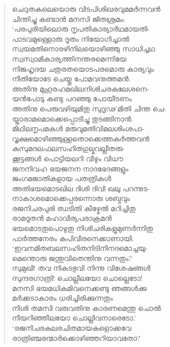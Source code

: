 \begin{verse}
ചെറുതകലെയൊരു വിടപിശിഖരവുമമര്‍ന്നവന്‍\\
ചിന്തിച്ചു കണ്ടാന്‍ മനസി ജിതശ്രമം:\\
‘പരപുരിയിലൊരു നൃപതികാര്യാര്‍ഥമായതി-\\
പാടവമുള്ളൊരു ദൂതം നിയോഗിച്ചാല്‍\\
സ്വയമതിനൊരഴിനിലയൊഴിഞ്ഞു സാധിച്ചഥ\\
സ്വസ്വാമികാര്യത്തിനന്തരമെന്നിയേ\\
നിജഹൃദയ ചതുരതയൊടപരമൊരു കാര്യവും\\
നീതിയോടേ ചെയ്തു പോമവനുത്തമന്‍.\\
അതിനു മുഹുരഹമഖിലനിശിചരകുലേശനെ-\\
യന്‍പോടു കണ്ടു പറഞ്ഞു പോയീടണം\\
അതിനു പെരുവഴിയുമിതു സുദൃഢ’മിതി ചിന്ത ചെ-\\
യ്താരാമമൊക്കെപ്പൊടിച്ചു തുടങ്ങിനാന്‍.\\
മിഥിലനൃപമകള്‍ മരുവുമതിവിമലശിംശപാ-\\
വൃക്ഷമൊഴിഞ്ഞുള്ളതൊക്കെത്തകര്‍ത്തവന്‍\\
കുസുമദലഫലസഹിതഗുല്മവല്ലീതരു-\\
ക്കൂട്ടങ്ങള്‍ പൊട്ടിയലറി വീഴും വിധൗ\\
ജനനിവഹ ഭയജനന നാദഭേദങ്ങളും\\
ജംഗമജാതികളായ പതത്രികള്‍\\
അതിഭയമൊടഖില ദിശി ദിവി ഖലു പറന്നുട-\\
നാകാശമൊക്കെപ്പരന്നൊരു ശബ്ദവും\\
രജനിചരപുരി ഝടിതി കീഴ്മേല്‍ മറിച്ചിതു\\
രാമദൂതന്‍ മഹാവീര്യപരാക്രമന്‍\\
ഭയമൊടതുപൊഴുതു നിശിചരികളുമുണര്‍ന്നിതു\\
പാര്‍ത്തനേരം കപിവീരനെക്കാണായി.\\
‘ഇവനമിതബലസഹിതനിടിനിനദമൊച്ചയു-\\
മെന്തൊരു ജന്തുവിതെന്തിനു വന്നതും?\\
സുമുഖി! തവ നികടഭുവി നിന്നു വിശേഷങ്ങള്‍\\
സുന്ദരഗാത്രി! ചൊല്ലീലയോ ചൊല്ലെടോ!\\
മനസി ഭയമധികമിവനെക്കണ്ടു ഞങ്ങള്‍ക്കു\\
മര്‍ക്കടാകാരം ധരിച്ചിരിക്കുന്നതും\\
നിശി തമസി വരുവതിനു കാരണമെന്തു ചൊല്‍\\
നീയറിഞ്ഞീലയോ ചൊല്ലിവനാരെടോ.’\\
‘രജനിചരകുലരചിതമായകളൊക്കവേ\\
രാത്രിഞ്ചരന്മാര്‍ക്കൊഴിഞ്ഞറിയാവതോ?\\

\end{verse}
